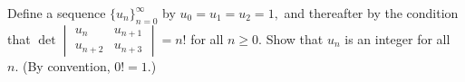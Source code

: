 Define a sequence $\{u_n\}_{n=0}^{\infty}$ by $u_0=u_1=u_2=1,$ and thereafter by the condition that
$\det\begin{vmatrix} u_n & u_{n+1} \\ u_{n+2} & u_{n+3} \end{vmatrix}=n!$
for all $n\ge 0.$ Show that $u_n$ is an integer for all $n.$ (By convention, $0!=1$.)